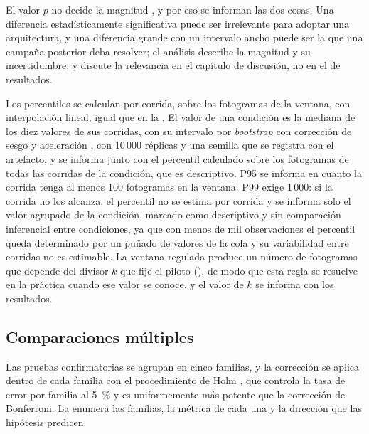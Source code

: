 El valor $p$ no decide la magnitud \cite{wasserstein2016}, y por eso se
informan las dos cosas. Una
diferencia estadísticamente significativa puede ser irrelevante para adoptar
una arquitectura, y una diferencia grande con un intervalo ancho puede ser la
que una campaña posterior deba resolver; el análisis describe la magnitud y su
incertidumbre, y discute la relevancia en el capítulo de discusión, no en el
de resultados.

Los percentiles se calculan por corrida, sobre los fotogramas de la ventana,
con interpolación lineal, igual que en la . El
valor de una condición es la mediana de los diez valores de sus corridas, con
su intervalo por \emph{bootstrap} con corrección de sesgo y aceleración
\cite{efron1994}, con 10\,000 réplicas y una semilla que se registra con el
artefacto, y se informa junto con el percentil
calculado sobre los fotogramas de todas las corridas de la condición, que es
descriptivo. P95 se informa en cuanto la corrida tenga al menos 100 fotogramas
en la ventana. P99 exige 1\,000: si la corrida no los alcanza, el percentil no
se estima por corrida y se informa solo el valor agrupado de la condición,
marcado como descriptivo y sin comparación inferencial entre condiciones, ya
que con menos de mil observaciones el percentil queda determinado por un
puñado de valores de la cola y su variabilidad entre corridas no es estimable.
La ventana regulada produce un número de fotogramas que depende del divisor
$k$ que fije el piloto (), de modo que esta regla se
resuelve en la práctica cuando ese valor se conoce, y el valor de $k$ se
informa con los resultados.

\subsection{Comparaciones múltiples}
\label{sec:analysis-multiplicity}

Las pruebas confirmatorias se agrupan en cinco familias, y la corrección se
aplica dentro de cada familia con el procedimiento de Holm \cite{holm1979},
que controla la tasa de error por familia al 5~\% y es uniformemente más
potente que la corrección de Bonferroni. La  enumera las
familias, la métrica de cada una y la dirección que las hipótesis predicen.

